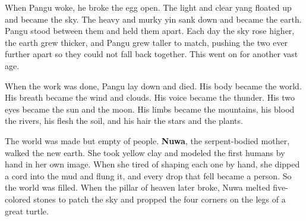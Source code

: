 When Pangu woke, he broke the egg open. The light and clear yang floated up and
became the sky. The heavy and murky yin sank down and became the earth. Pangu
stood between them and held them apart. Each day the sky rose higher, the earth
grew thicker, and Pangu grew taller to match, pushing the two ever further apart
so they could not fall back together. This went on for another vast age.

When the work was done, Pangu lay down and died. His body became the world. His
breath became the wind and clouds. His voice became the thunder. His two eyes
became the sun and the moon. His limbs became the mountains, his blood the
rivers, his flesh the soil, and his hair the stars and the plants.

The world was made but empty of people. \textbf{Nuwa}, the serpent-bodied mother,
walked the new earth. She took yellow clay and modeled the first humans by hand
in her own image. When she tired of shaping each one by hand, she dipped a cord
into the mud and flung it, and every drop that fell became a person. So the world
was filled. When the pillar of heaven later broke, Nuwa melted five-colored
stones to patch the sky and propped the four corners on the legs of a great
turtle.
